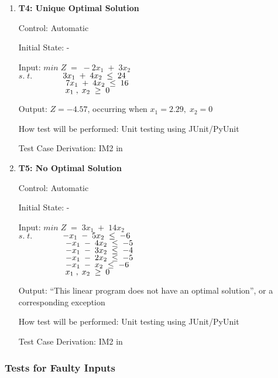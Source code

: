 \documentclass[12pt, titlepage]{article}
\begin{document}
\begin{enumerate}
	\item{\textbf{T4: Unique Optimal Solution}}
	
	Control: Automatic 
	
	Initial State: -
	
	Input: $min\;Z\;=\;-2x_1\;+\;3x_2$\\
	$s.\;t.$$\hspace*{1.3cm} 3x_1\;+\;4x_2\; \leq \;24$\\
	$\hspace*{2cm} 7x_1\;+\;4x_2\; \leq \;16$\\
	$\hspace*{2cm} x_1\;,\;x_2\; \geq \;0$
	
	Output: $Z = -4.57$, occurring when $x_1=2.29,\;x_2=0$
	
	How test will be performed: Unit testing using JUnit/PyUnit
	
	Test Case Derivation: IM2 in \cite{losms-ca}
	
	\item{\textbf{T5: No Optimal Solution}}
	
	Control: Automatic 
	
	Initial State: -
	
	Input: $min\;Z\;=\;3x_1\;+\;14x_2$\\
	$s.\;t.$$\hspace*{1.3cm} -x_1\;-\;5x_2\; \leq \;-6$\\
	$\hspace*{2cm} -x_1\;-\;4x_2\; \leq \;-5$\\
	$\hspace*{2cm} -x_1\;-\;3x_2\; \leq \;-4$\\
	$\hspace*{2cm} -x_1\;-\;2x_2\; \leq \;-5$\\
	$\hspace*{2cm} -x_1\;-\;x_2\; \leq \;-6$\\
	$\hspace*{2cm} x_1\;,\;x_2\; \geq \;0$
	
	Output: ``This linear program does not have an optimal solution'', or a 
	corresponding exception
	
	How test will be performed: Unit testing using JUnit/PyUnit
	
	Test Case Derivation: IM2 in \cite{losms-ca}
\end{enumerate}

\subsubsection{Tests for Faulty Inputs}
\end{document}

